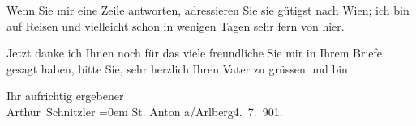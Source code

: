 \pstart
           Wenn Sie mir eine Zeile antworten, adressieren Sie sie gütigst nach Wien; ich bin auf Reisen und vielleicht schon in wenigen Tagen
               sehr fern von hier.\pend
           
\pstart
           Jetzt danke ich Ihnen noch für das viele freundliche \label{T_L01141-1v}\label{T_L01141-1} Sie mir in Ihrem Briefe gesagt haben, bitte Sie,
               sehr herzlich Ihren Vater zu
               grüssen und bin\pend
           
\pstart
           Ihr aufrichtig ergebener{\\[\baselineskip]}\spacefill\mbox{Arthur Schnitzler}\pend
           \leftskip=0em{}
\pstart
           St. Anton a/Arlberg4. 7. 901.\pend
           \endnumbering{}  \newcommand{\dateiname}{L01141}\newcommand{\titel}{Arthur Schnitzler an Edith Brandes, 4. 7. 1901}\newcommand{\editorInnen}{Martin Anton Müller und Gerd-Hermann Susen}

